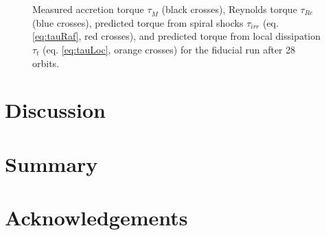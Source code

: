 \documentclass{emulateapj}
\begin{document}
\begin{figure}
	\caption{\label{fi:torque} Measured accretion torque $\tau_{\dot{M}}$ (black crosses), Reynolds torque $\tau_{Re}$ (blue crosses), predicted torque from spiral shocks $\tau_{irr}$ (eq. \eqref{eq:tauRaf}, red crosses), and predicted torque from local dissipation $\tau_t$ (eq. \eqref{eq:tauLoc}, orange crosses) for the fiducial run after 28 orbits.}  
\end{figure}


\section{Discussion}
\label{sec:discussion}




\section{Summary}
\label{sec:summary}





\section{Acknowledgements}


\newpage





%
\end{document}
